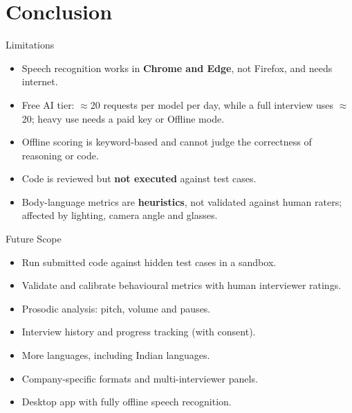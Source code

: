 \documentclass[aspectratio=169,11pt,xcolor=table]{beamer}
\begin{document}
\section{Conclusion}
\begin{frame}{Limitations}
  \begin{itemize}
    \item Speech recognition works in \textbf{Chrome and Edge}, not Firefox, and needs internet.
    \item Free AI tier: $\approx$20 requests per model per day, while a full interview uses $\approx$20; heavy use needs a paid key or Offline mode.
    \item Offline scoring is keyword-based and cannot judge the correctness of reasoning or code.
    \item Code is reviewed but \textbf{not executed} against test cases.
    \item Body-language metrics are \textbf{heuristics}, not validated against human raters; affected by lighting, camera angle and glasses.
  \end{itemize}
\end{frame}

\begin{frame}{Future Scope}
  \begin{itemize}
    \item Run submitted code against hidden test cases in a sandbox.
    \item Validate and calibrate behavioural metrics with human interviewer ratings.
    \item Prosodic analysis: pitch, volume and pauses.
    \item Interview history and progress tracking (with consent).
    \item More languages, including Indian languages.
    \item Company-specific formats and multi-interviewer panels.
    \item Desktop app with fully offline speech recognition.
  \end{itemize}
\end{frame}
\end{document}
